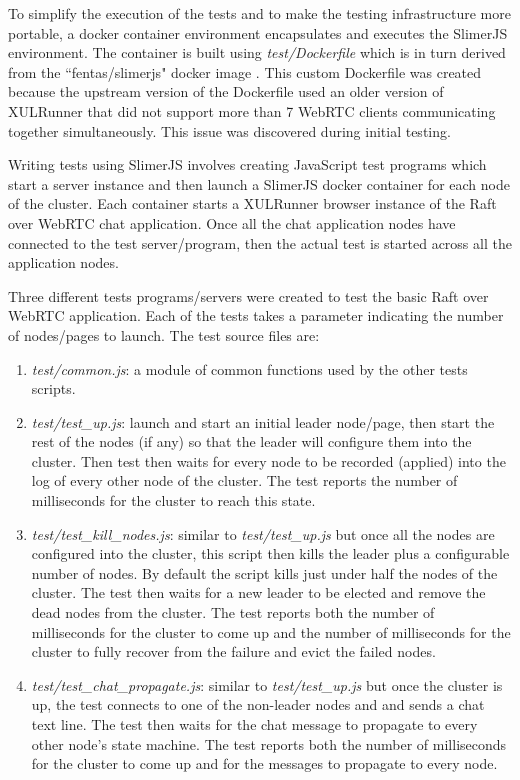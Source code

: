 \documentclass[conference,compsoc]{./IEEEtran/IEEEtran}
\begin{document}
To simplify the execution of the tests and to make the testing infrastructure more portable, a docker container environment encapsulates and executes the SlimerJS environment. The container is built using \emph{test/Dockerfile} which is in turn derived from the ``fentas/slimerjs" docker image \cite{fentas:slimerjs}.  This custom Dockerfile was created because the upstream version of the Dockerfile used an older version of XULRunner that did not support more than 7 WebRTC clients communicating together simultaneously. This issue was discovered during initial testing.

Writing tests using SlimerJS involves creating JavaScript test programs which start a server instance and then launch a SlimerJS docker container for each node of the cluster. Each container starts a XULRunner browser instance of the Raft over WebRTC chat application. Once all the chat application nodes have connected to the test server/program, then the actual test is started across all the application nodes.

Three different tests programs/servers were created to test the basic Raft over WebRTC application. Each of the tests takes a parameter indicating the number of nodes/pages to launch. The test source files are:

\begin{enumerate}
\item \emph{test/common.js}: a module of common functions used by the other tests scripts.
\item \emph{test/test\_up.js}: launch and start an initial leader node/page, then start the rest of the nodes (if any) so that the leader will configure them into the cluster. Then test then waits for every node to be recorded (applied) into the log of every other node of the cluster. The test reports the number of milliseconds for the cluster to reach this state.
\item \emph{test/test\_kill\_nodes.js}: similar to \emph{test/test\_up.js} but once all the nodes are configured into the cluster, this script then kills the leader plus a configurable number of nodes. By default the script kills just under half the nodes of the cluster. The test then waits for a new leader to be elected and remove the dead nodes from the cluster. The test reports both the number of milliseconds for the cluster to come up and the number of milliseconds for the cluster to fully recover from the failure and evict the failed nodes.
\item \emph{test/test\_chat\_propagate.js}: similar to \emph{test/test\_up.js} but once the cluster is up, the test connects to one of the non-leader nodes and and sends a chat text line. The test then waits for the chat message to propagate to every other node's state machine. The test reports both the number of milliseconds for the cluster to come up and for the messages to propagate to every node.
\end{enumerate}
\end{document}
